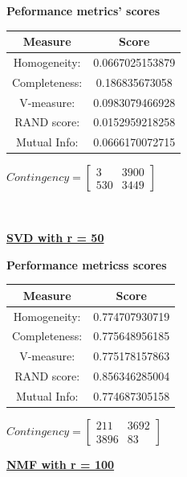 \documentclass{article}
\begin{document}
\begin{center}
	\textbf{Peformance metrics' scores} \\ \vspace{10pt}	
	\begin{tabular}{*{2}{c}}
		\toprule
		\textbf{Measure} & \textbf{Score} \\	
		\midrule	
		Homogeneity: & 0.0667025153879 \\
		\midrule
		Completeness: & 0.186835673058 \\
		\midrule
		V-measure: & 0.0983079466928 \\
		\midrule
		RAND score: & 0.0152959218258 \\
		\midrule
		Mutual Info: & 0.0666170072715 \\
		\bottomrule
	\end{tabular}
	\qquad	
	$Contingency = \left[\begin{array}{*{2}{c}}
			3 	& 3900 \\
			530 & 3449 
				\end{array}\right]
		$
\end{center}
\\ \vspace{20pt}

\underline{\textbf{SVD with r = 50}} 

\begin{center}
	\textbf{Performance metricss scores} \\ \vspace{10pt}	
	\begin{tabular}{*{2}{c}}
		\toprule
		\textbf{Measure} & \textbf{Score} \\
		\midrule		
		Homogeneity: & 0.774707930719  \\
		\midrule
		Completeness: & 0.775648956185 \\
		\midrule
		V-measure: & 0.775178157863 \\
		\midrule
		RAND score: & 0.856346285004 \\
		\midrule
		Mutual Info: & 0.774687305158 \\
		\bottomrule
	\end{tabular}
	\qquad
	$Contingency = \left[\begin{array}{*{2}{c}}
		211  & 3692 \\
		3896 & 83
			\end{array}\right]
		$
\end{center}
\newpage

\underline{\textbf{NMF with r = 100}} 
\end{document}
